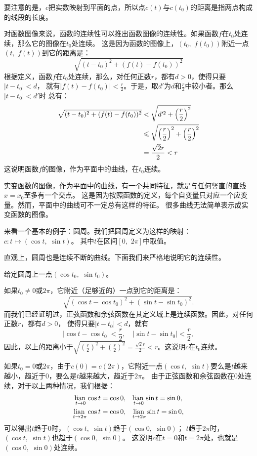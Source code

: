 \documentclass[12pt,UTF8]{ctexbook}
\newcommand\lian[1]{
    \underset{#1}{\operatorname{lian}\,}
}
\begin{document}
要注意的是，$c$把实数映射到平面的点，所以点$c(t)$与$c(t_0)$的距离是指两点构成的线段的长度。

对函数图像来说，函数的连续性可以推出函数图像的连续性。如果函数$f$在$t_0$处连续，那么它的图像在$t_0$处连续。
这是因为函数的图像上，$(t_0,\,\, f(t_0))$附近一点$(t,\,\, f(t))$到它的距离是：
$$ \sqrt{(t - t_0)^2 + (f(t) - f(t_0))^2} $$
根据定义，函数$f$在$t_0$处连续，那么，对任何正数$r$，都有$d>0$，使得只要$|t - t_0| < d$，
就有$|f(t) - f(t_0)| < \frac{r}{2}$。于是，取$d'$为$d$和$\frac{r}{2}$中较小者。那么$|t - t_0| < d'$时
总有：
\begin{align}
    \sqrt{(t - t_0)^2 + (f(t) - f(t_0))^2} &< \sqrt{d'^2 + \left(\frac{r}{2}\right)^2} \notag \\
    &\leqslant \sqrt{\left(\frac{r}{2}\right)^2 + \left(\frac{r}{2}\right)^2} \notag \\
    &= \frac{\sqrt{2}r}{2} < r \notag
\end{align}
这说明函数$f$的图像，作为平面中的曲线，在$t_0$连续。

实变函数的图像，作为平面中的曲线，有一个共同特征，就是与任何竖直的直线$x = x_0$至多有一个交点。
这是因为按照函数的定义，每个自变量只对应一个应变量。然而，平面中的曲线可不一定总有这样的特征。
很多曲线无法简单表示成实变函数的图像。

来看一个基本的例子：圆周。我们把圆周定义为这样的映射：$c: t\mapsto (\cos{t}, \,\, \sin{t})$。
其中$t$在区间$[0, \,\,2\pi]$中取值。

直观上，圆周也是连续不断的曲线。下面我们来严格地说明它的连续性。

给定圆周上一点$(\cos{t_0}, \,\, \sin{t_0})$。

如果$t_0 \neq 0$或$2\pi$，它附近（足够近的）一点到它的距离是：
$$ \sqrt{(\cos{t} - \cos{t_0})^2 + (\sin{t} - \sin{t_0})^2}. $$
而我们已经证明过，正弦函数和余弦函数在其定义域上是连续函数。因此，对任何正数$r$，都有$d>0$，
使得只要$|t - t_0| < d$，就有
$$ |\cos{t} - \cos{t_0}| < \frac{r}{2}, \quad |\sin{t} - \sin{t_0}| < \frac{r}{2}, $$
因此，以上的距离小于$\sqrt{\left(\frac{r}{2}\right)^2 + \left(\frac{r}{2}\right)^2} = \frac{\sqrt{2}r}{2} < r$。这说明$c$在$t_0$连续。

如果$t_0 = 0$或$2\pi$，由于$c(0) = c(2\pi)$，它附近一点$(\cos{t}, \,\, \sin{t})$要么是$t$越来越小，趋近于$0$，要么是$t$越来越大，趋近于$2\pi$。
由于正弦函数和余弦函数在$0$处连续，对于以上两种情况，我们根据：
\begin{align}
    \lian{t \to 0} \cos{t} = \cos{0}, \quad &\lian{t \to 0} \sin{t} = \sin{0}, \notag \\
    \lian{t \to 2\pi} \cos{t} = \cos{0}, \quad &\lian{t \to 2\pi} \sin{t} = \sin{0}, \notag 
\end{align}
可以得出$t$趋于$0$时，$(\cos{t}, \,\, \sin{t})$趋于$(\cos{0}, \,\, \sin{0})$；
$t$趋于$2\pi$时，$(\cos{t}, \,\, \sin{t})$也趋于$(\cos{0}, \,\, \sin{0})$。
这说明$c$在$t=0$和$t=2\pi$处，也就是$(\cos{0}, \,\, \sin{0})$处连续。
\end{document}
